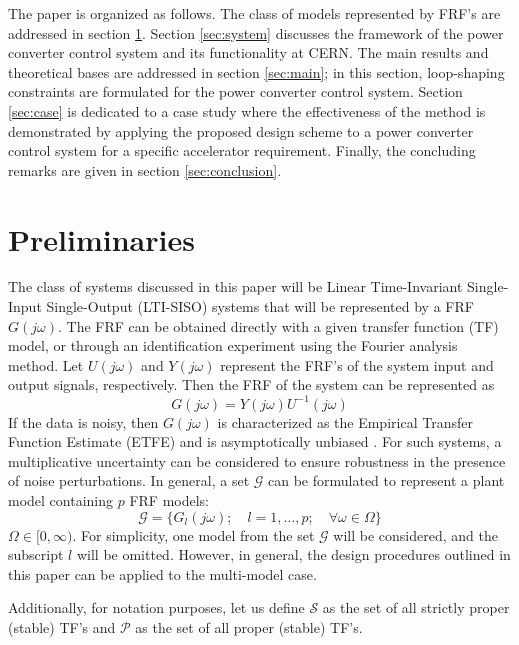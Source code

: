 \documentclass[a4paper, 10pt, conference]{ieeeconf}
\newcommand{\jo}{(j\omega)}
\begin{document}
The paper is organized as follows. The class of models represented by FRF's are addressed in section \ref{sec:prelim}. Section \ref{sec:system} discusses the framework of the power converter control system and its functionality at CERN. The main results and theoretical bases are addressed in section \ref{sec:main}; in this section, loop-shaping constraints are formulated for the power converter control system. Section \ref{sec:case} is dedicated to a case study where the effectiveness of the method is demonstrated by applying the proposed design scheme to a power converter control system for a specific accelerator requirement. Finally, the concluding remarks are given in section \ref{sec:conclusion}.

\section{Preliminaries}
\label{sec:prelim}
The class of systems discussed in this paper will be Linear Time-Invariant Single-Input Single-Output (LTI-SISO) systems that will be represented by a FRF $G\jo$.  The FRF can be obtained directly with a given transfer function (TF) model, or through an identification experiment using the Fourier analysis method. Let $U\jo$ and $Y\jo$ represent the FRF's of the system input and output signals, respectively. Then the FRF of the system can be represented as 
\begin{equation}
G\jo = Y\jo U^{-1}\jo
\end{equation}
If the data is noisy, then $G\jo$ is characterized as the Empirical Transfer Function Estimate (ETFE) and is asymptotically unbiased \cite{Lju99}. For such systems, a multiplicative uncertainty can be considered to ensure robustness in the presence of noise perturbations. In general, a set $\mathcal{G}$ can be formulated to represent a plant model containing $p$ FRF models:
\begin{equation}
\mathcal{G} = \{G_l\jo; \quad l=1,\ldots,p; \quad \forall \omega \in \Omega\}
\end{equation} 
$\Omega \in [0,\infty)$. For simplicity, one model from the set $\mathcal{G}$ will be considered, and the subscript $l$ will be omitted. However, in general, the design procedures outlined in this paper can be applied to the multi-model case. 

Additionally, for notation purposes, let us define $\mathscr{S}$ as the set of all strictly proper (stable) TF's and $\mathscr{P}$ as the set of all proper (stable) TF's. 
\end{document}
